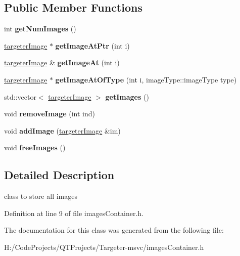 \subsection*{Public Member Functions}
\begin{DoxyCompactItemize}
\item 
\mbox{\label{class_images_container_a0b318e09e4bef3654167c753173062db}} 
int {\bfseries get\+Num\+Images} ()
\item 
\mbox{\label{class_images_container_abfb496674a35192bb3911ef5de704e5d}} 
\hyperlink{classtargeter_image}{targeter\+Image} $\ast$ {\bfseries get\+Image\+At\+Ptr} (int i)
\item 
\mbox{\label{class_images_container_abd99550c899f54291d9a449287bf89cc}} 
\hyperlink{classtargeter_image}{targeter\+Image} \& {\bfseries get\+Image\+At} (int i)
\item 
\mbox{\label{class_images_container_a6c7aea31ee7e6ec8c4c29f677ae57102}} 
\hyperlink{classtargeter_image}{targeter\+Image} $\ast$ {\bfseries get\+Image\+At\+Of\+Type} (int i, image\+Type\+::image\+Type type)
\item 
\mbox{\label{class_images_container_a3a7d1fe60da597aa0bd1eb5e7d95a5b7}} 
std\+::vector$<$ \hyperlink{classtargeter_image}{targeter\+Image} $>$ {\bfseries get\+Images} ()
\item 
\mbox{\label{class_images_container_a7d26fc141f4a3f0b01530b232cc4ba3d}} 
void {\bfseries remove\+Image} (int ind)
\item 
\mbox{\label{class_images_container_af2acb74349b643c59e4d1e23ec17ab2e}} 
void {\bfseries add\+Image} (\hyperlink{classtargeter_image}{targeter\+Image} \&im)
\item 
\mbox{\label{class_images_container_aaa184b4198472cd81a8dfeb242644369}} 
void {\bfseries free\+Images} ()
\end{DoxyCompactItemize}


\subsection{Detailed Description}
class to store all images 

Definition at line 9 of file images\+Container.\+h.



The documentation for this class was generated from the following file\+:\begin{DoxyCompactItemize}
\item 
H\+:/\+Code\+Projects/\+Q\+T\+Projects/\+Targeter-\/msvc/images\+Container.\+h\end{DoxyCompactItemize}
